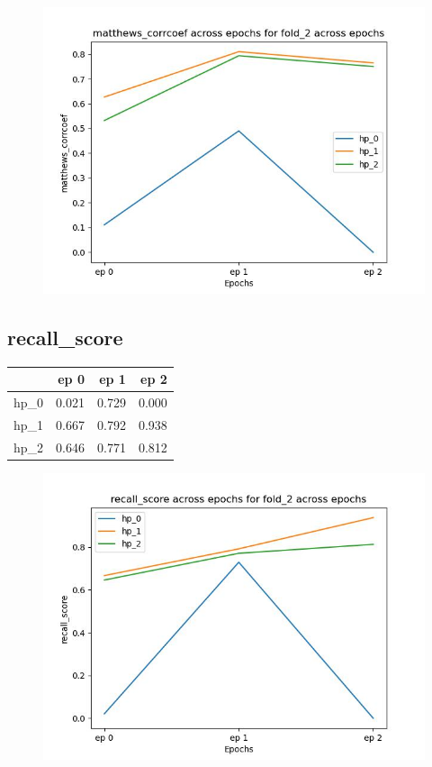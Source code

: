 \documentclass{article}
\begin{document}
\begin{figure}[H]
\includegraphics[scale = 0.75]{fold_2/matthews_corrcoef}
\end{figure}
\subsection{recall\_score}
\begin{tabular}{lrrr}
\toprule
{} &   ep 0 &   ep 1 &   ep 2 \\
\midrule
hp\_0 &  0.021 &  0.729 &  0.000 \\
hp\_1 &  0.667 &  0.792 &  0.938 \\
hp\_2 &  0.646 &  0.771 &  0.812 \\
\bottomrule
\end{tabular}

\begin{figure}[H]
\includegraphics[scale = 0.75]{fold_2/recall_score}
\end{figure}
\end{document}
